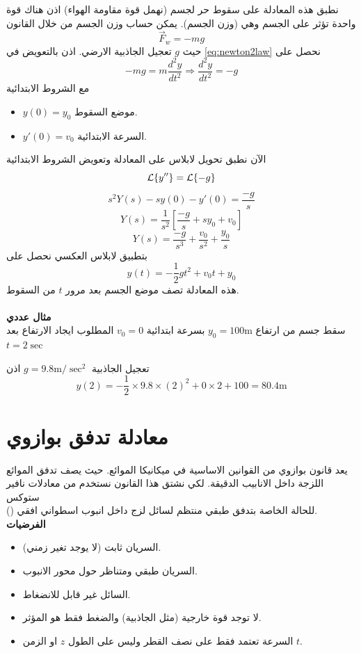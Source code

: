 نطبق هذه المعادلة على سقوط حر لجسم (نهمل قوة مقاومة الهواء) اذن هناك قوة واحدة تؤثر على الجسم وهي (وزن الجسم). يمكن حساب وزن الجسم من خلال القانون 
\[
\vec{F}_w = - mg
\]
حيث $g$ تعجيل الجاذبية الارضي. اذن بالتعويض في \eqref{eq:newton2law} نحصل على 
\begin{equation}
	\label{eq:freefall}
	- mg = m \frac{d^2 y}{dt^2} \Rightarrow \frac{d^2 y}{dt^2}  = -g
\end{equation}
مع الشروط الابتدائية
\begin{itemize}
	\item $y(0) = y_0$ موضع السقوط.
	\item $y'(0) = v_0$ السرعة الابتدائية.
\end{itemize}
الآن نطبق تحويل لابلاس على المعادلة وتعويض الشروط الابتدائية
\[
\mathcal{L}\{y''\} = \mathcal{L}\{-g\}
\]
\[
s^2Y(s) - s y(0) - y'(0) = \frac{-g}{s} 
\]
\[
Y(s) = \frac{1}{s^2} \left[\frac{-g}{s} + sy_0 + v_0\right]
\]
\[
Y(s) = \frac{-g}{s^3} + \frac{v_0}{s^2} + \frac{y_0}{s}
\]
بتطبيق لابلاس العكسي نحصل على
\begin{equation}
	\label{eq:motionsol}
	y(t) = -\frac{1}{2}gt^2 + v_0 t +y_0
\end{equation}
هذه المعادلة تصف موضع الجسم بعد مرور $t$ من السقوط.\\ \\
\noindent
\textbf{مثال عددي}\\
\noindent
سقط جسم من ارتفاع $y_0 = 100\text{m}$ بسرعة ابتدائية $v_0 = 0 $ المطلوب ايجاد الارتفاع بعد $t = 2\sec$
\begin{solution}
	تعجيل الجاذبية $g = 9.8 \text{m}/\sec^2$ اذن
	\[
	y(2) = -\frac{1}{2} \times 9.8 \times (2)^2 + 0 \times 2 + 100 = 80.4 \text{m}
	\]
\end{solution}

\section{معادلة تدفق بوازوي }
يعد قانون بوازوي من القوانين الاساسية في ميكانيكا الموائع. حيث يصف تدفق الموائع اللزجة داخل الانابيب الدقيقة. لكي نشتق هذا القانون نستخدم من معادلات نافير ستوكس \\() للحالة الخاصة بتدفق طبقي منتظم لسائل لزج داخل انبوب اسطواني افقي.\\
\noindent
\textbf{الفرضيات}
\begin{itemize}
	\item السريان ثابت (لا يوجد تغير زمني).
	\item السريان طبقي ومتناظر حول محور الانبوب.
	\item السائل غير قابل للانضغاط.
	\item لا توجد قوة خارجية (مثل الجاذبية) والضغط فقط هو المؤثر.
	\item السرعة تعتمد فقط على نصف القطر وليس على الطول $z$ او الزمن $t$.
\end{itemize}

